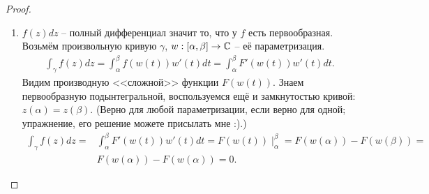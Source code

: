 \begin{proof} \hfil
	\begin{enumerate}
		\item $f(z) dz$ -- полный дифференциал значит то, что у $f$ есть первообразная. Возьмём произвольную кривую $\gamma$, $w: [\alpha, \beta] \to \mathbb{C}$ -- её параметризация.
			\begin{align*}
				\int_\gamma f(z) dz = \int_\alpha^\beta f(w(t)) w'(t) dt = \int_\alpha^\beta F'(w(t)) w'(t) dt.
			\end{align*}
		Видим производную <<сложной>> функции $F(w(t))$. Знаем первообразную подынтегральной, воспользуемся ещё и замкнутостью кривой: $z(\alpha) = z(\beta)$. (Верно для любой параметризации, если верно для одной; упражнение, его решение можете присылать мне :).)
		\begin{align*}
			\int_\gamma f(z) dz = & \int_\alpha^\beta F'(w(t)) w'(t) dt = F(w(t)) \mid_\alpha^\beta = F(w(\alpha)) - F(w(\beta)) = \\
			& F(w(\alpha)) - F(w(\alpha)) = 0.
		\end{align*}
	

\end{enumerate}
\end{proof}
